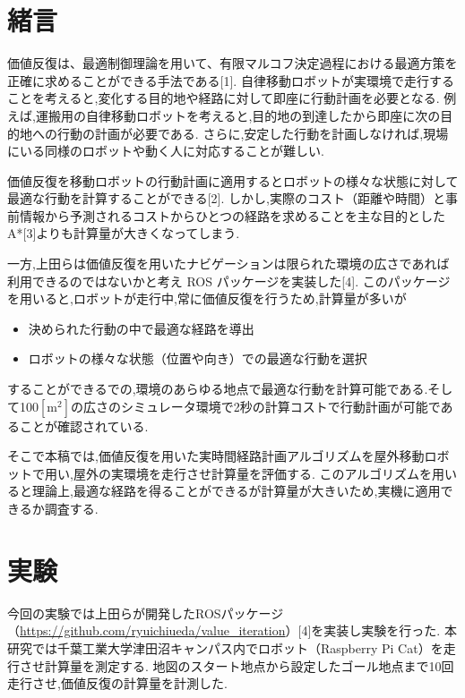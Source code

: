\documentclass{jarticle}
\begin{document}
\small
\section{緒言}%
価値反復は、最適制御理論を用いて、有限マルコフ決定過程における最適方策を正確に求めることができる手法である[1].
自律移動ロボットが実環境で走行することを考えると,変化する目的地や経路に対して即座に行動計画を必要となる.
例えば,運搬用の自律移動ロボットを考えると,目的地の到達したから即座に次の目的地への行動の計画が必要である.
さらに,安定した行動を計画しなければ,現場にいる同様のロボットや動く人に対応することが難しい.

価値反復を移動ロボットの行動計画に適用するとロボットの様々な状態に対して最適な行動を計算することができる[2].
しかし,実際のコスト（距離や時間）と事前情報から予測されるコストからひとつの経路を求めることを主な目的とした A*[3]よりも計算量が大きくなってしまう.

一方,上田らは価値反復を用いたナビゲーションは限られた環境の広さであれば利用できるのではないかと考え ROS パッケージを実装した[4].
このパッケージを用いると,ロボットが走行中,常に価値反復を行うため,計算量が多いが
\begin{itemize}
	\item 決められた行動の中で最適な経路を導出
	\item ロボットの様々な状態（位置や向き）での最適な行動を選択
 \end{itemize}
することができるでの,環境のあらゆる地点で最適な行動を計算可能である.そして100$\mathrm{[m^2]}$の広さのシミュレータ環境で2秒の計算コストで行動計画が可能であることが確認されている.

そこで本稿では,価値反復を用いた実時間経路計画アルゴリズムを屋外移動ロボットで用い,屋外の実環境を走行させ計算量を評価する.
このアルゴリズムを用いると理論上,最適な経路を得ることができるが計算量が大きいため,実機に適用できるか調査する.



\section{実験}%
今回の実験では上田らが開発したROSパッケージ（\href{https://github.com/ryuichiueda/value_iteration}{https://github.com/ryuichiueda/value\_iteration}）[4]を実装し実験を行った.
本研究では千葉工業大学津田沼キャンパス内でロボット（Raspberry Pi Cat）を走行させ計算量を測定する.
地図のスタート地点から設定したゴール地点まで10回走行させ,価値反復の計算量を計測した.
\end{document}
